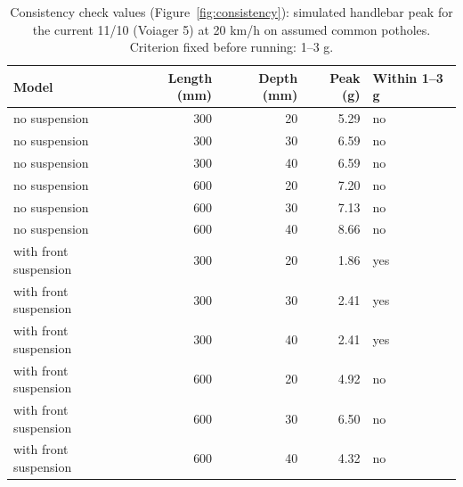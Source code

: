 \begin{table}[htbp]
\centering\small
\caption{Consistency check values (Figure~\ref{fig:consistency}): simulated handlebar peak for the current 11/10 (Voiager 5) at 20 km/h on assumed common potholes. Criterion fixed before running: 1--3 g.}\label{tab:Econs}
\begin{tabular}{@{}lrrrl@{}}
\toprule
Model & Length (mm) & Depth (mm) & Peak (g) & Within 1--3 g \\
\midrule
no suspension & 300 & 20 & 5.29 & no \\
no suspension & 300 & 30 & 6.59 & no \\
no suspension & 300 & 40 & 6.59 & no \\
no suspension & 600 & 20 & 7.20 & no \\
no suspension & 600 & 30 & 7.13 & no \\
no suspension & 600 & 40 & 8.66 & no \\
with front suspension & 300 & 20 & 1.86 & yes \\
with front suspension & 300 & 30 & 2.41 & yes \\
with front suspension & 300 & 40 & 2.41 & yes \\
with front suspension & 600 & 20 & 4.92 & no \\
with front suspension & 600 & 30 & 6.50 & no \\
with front suspension & 600 & 40 & 4.32 & no \\
\bottomrule
\end{tabular}
\end{table}

